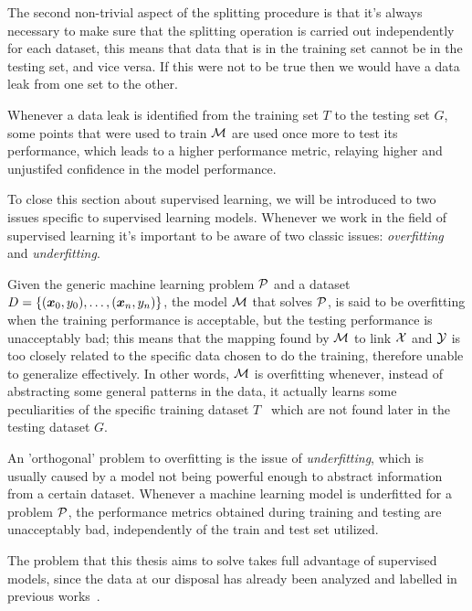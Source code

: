 \medskip

The second non-trivial aspect of the splitting procedure is that it's always necessary to make sure
that the splitting operation is carried out independently for each dataset, this means that data that is in the
training set cannot be in the testing set, and vice versa. If this were not to be true then we would
have a data leak from one set to the other.

\smallskip

Whenever a data leak is identified from the training set $T$ to the testing set $G$, some points
that were used to train $\mathcal{M}$ are used once more to test its performance, which leads to a higher
performance metric, relaying higher and unjustifed confidence in the model performance.

\medskip

To close this section about supervised learning, we will be introduced to two issues specific to
supervised learning models. Whenever we work in the field of supervised learning it's important to be aware of two classic issues: \emph{overfitting} and \emph{underfitting}.

\smallskip

Given the generic machine learning problem $\mathcal{P}$ and a dataset $D = \{(\boldsymbol{x}_0, y_0), \ldots, (\boldsymbol{x}_n, y_n)\}$, the model $\mathcal{M}$ that
solves $\mathcal{P}$, is said to be overfitting when the training performance is acceptable, but the
testing performance is unacceptably bad; this means that the mapping found by $\mathcal{M}$ to link $\mathcal{X}$
and $\mathcal{Y}$ is too closely related to the specific data chosen to do the training, therefore
unable to generalize effectively. In other
words, $\mathcal{M}$ is overfitting whenever, instead of abstracting some general patterns in the
data, it actually learns some peculiarities of the specific training dataset $T$~\cite{ZhouZhi-Hua2021ML}
which are not found later in the testing dataset $G$.

\smallskip

An 'orthogonal' problem to overfitting is the issue of \emph{underfitting}, which is usually caused
by a model not being powerful enough to abstract information from a certain dataset. Whenever a
machine learning model is underfitted for a problem $\mathcal{P}$, the performance metrics obtained
during training and testing are unacceptably bad, independently of the train and test set
utilized.

\medskip

The problem that this thesis aims to solve takes full advantage of supervised models, since the data at our
disposal has already been analyzed and labelled in previous works~\cite{mariotto2022}\cite{mariotto2022-generic}.

